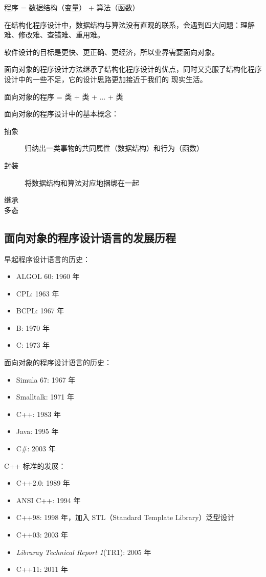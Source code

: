 \documentclass[UTF8]{ctexart}
\begin{document}
程序 = 数据结构（变量） + 算法（函数）

在结构化程序设计中，数据结构与算法没有直观的联系，会遇到四大问题：理解难、修改难、查错难、重用难。

软件设计的目标是更快、更正确、更经济，所以业界需要面向对象。

面向对象的程序设计方法继承了结构化程序设计的优点，同时又克服了结构化程序设计中的一些不足，它的设计思路更加接近于我们的
现实生活。

面向对象的程序 = 类 + 类 + ... + 类

面向对象的程序设计中的基本概念：
\begin{description}
    \item[抽象] 归纳出一类事物的共同属性（数据结构）和行为（函数）
    \item[封装] 将数据结构和算法对应地捆绑在一起
    \item[继承]
    \item[多态]
\end{description}

\subsection{面向对象的程序设计语言的发展历程}
早起程序设计语言的历史：
\begin{itemize}
    \item ALGOL 60: 1960 年
    \item CPL: 1963 年
    \item BCPL: 1967 年
    \item B: 1970 年
    \item C: 1973 年
\end{itemize}

面向对象的程序设计语言的历史：
\begin{itemize}
    \item Simula 67: 1967 年
    \item Smalltalk: 1971 年
    \item C++: 1983 年
    \item Java: 1995 年
    \item C\#: 2003 年
\end{itemize}

C++ 标准的发展：
\begin{itemize}
    \item C++2.0: 1989 年
    \item ANSI C++: 1994 年
    \item C++98: 1998 年，加入 STL（Standard Template Library）泛型设计
    \item C++03: 2003 年
    \item \emph{Libraray Technical Report 1}(TR1): 2005 年
    \item C++11: 2011 年
\end{itemize}
\end{document}
